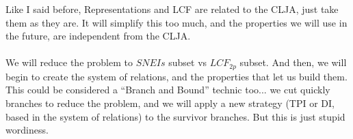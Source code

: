 		\noindent
		Like I said before, Representations and LCF are related to the CLJA, just take them as they are. It will simplify this too much, and the properties we will use in the future, are independent from the CLJA.
		\\\\
		
		\noindent
		We will reduce the problem to $SNEIs$ subset vs $LCF_{2p}$ subset. And then, we will begin to create the system of relations, and the properties that let us build them. This could be considered a ``Branch and Bound'' technic too... we cut quickly branches to reduce the problem, and we will apply a new strategy (TPI or DI, based in the system of relations) to the survivor branches. But this is just stupid wordiness.
		\\\\

\newpage